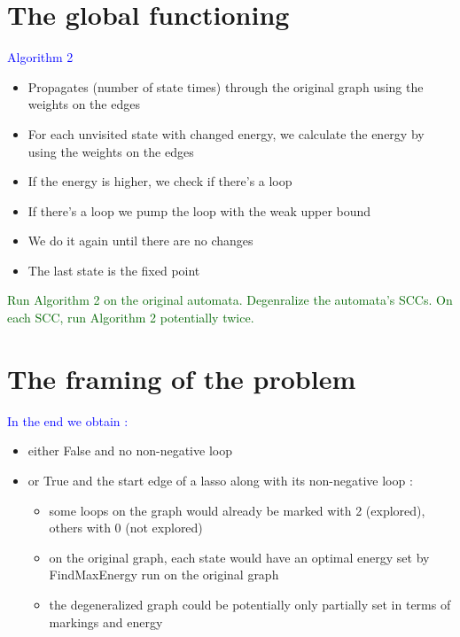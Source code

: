 \documentclass{rapport}
\begin{document}
\section{The global functioning}

\textcolor{blue}{Algorithm 2}\\
\begin{itemize}
    \item Propagates (number of state times) through the original graph using the weights on the edges
    \item For each unvisited state with changed energy, we calculate the energy by using the weights on the edges
    \item If the energy is higher, we check if there’s a loop
    \item If there’s a loop we pump the loop with the weak upper bound
    \item We do it again until there are no changes
    \item The last state is the fixed point
\end{itemize}

\vspace{12pt}

\textcolor[HTML]{006400}{Run Algorithm 2 on the original automata. Degenralize the automata’s SCCs. On each SCC, run Algorithm 2 potentially twice.}\\

\newpage

\section{The framing of the problem}

\textcolor{blue}{In the end we obtain :}\\
\begin{itemize}
    \item either False and no non-negative loop
    \item or True and the start edge of a lasso along with its non-negative loop :
    \begin{itemize}
        \item some loops on the graph would already be marked with 2 (explored), others with 0 (not explored)
        \item on the original graph, each state would have an optimal energy set by FindMaxEnergy run on the original graph
        \item the degeneralized graph could be potentially only partially set in terms of markings and energy
    \end{itemize}
\end{itemize}
\end{document}

